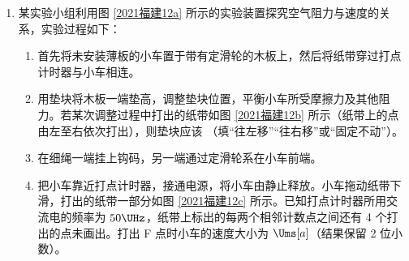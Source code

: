 \documentclass[\gkver]{gaokaozhenti}
\begin{document}
\begin{enumerate}
\begin{enumerate}
	\item
	测量完成之后，将表笔从插孔拔出，并将选择开关旋到“OFF”位置。
	
	\item
	实验测得的该电阻丝电阻率为  $\UOm[a]$（结果保留 3 位有效数字）。
\end{enumerate}

{figs/11b.png}



\item
某实验小组利用图 \ref{2021福建12a} 所示的实验装置探究空气阻力与速度的关系，实验过程如下：
\begin{enumerate}
	\item
	首先将未安装薄板的小车置于带有定滑轮的木板上，然后将纸带穿过打点计时器与小车相连。
	
	\item
	用垫块将木板一端垫高，调整垫块位置，平衡小车所受摩擦力及其他阻力。若某次调整过程中打出的纸带如图 \ref{2021福建12b} 所示（纸带上的点由左至右依次打出），则垫块应该 （填“往左移”“往右移”或“固定不动”）。
	
	\item
	在细绳一端挂上钩码，另一端通过定滑轮系在小车前端。
	
	\item
	把小车靠近打点计时器，接通电源，将小车由静止释放。小车拖动纸带下滑，打出的纸带一部分如图 \ref{2021福建12c} 所示。已知打点计时器所用交流电的频率为 $50 \UHz$，纸带上标出的每两个相邻计数点之间还有 4 个打出的点未画出。打出 F 点时小车的速度大小为  $\Ums[a]$（结果保留 2 位小数）。
	

\end{enumerate}
\end{enumerate}
\end{document}
